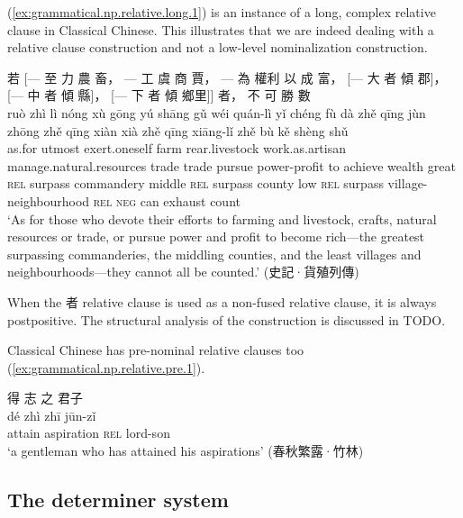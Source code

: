 \documentclass[UTF8, a4paper, oneside, scheme=plain, 12pt]{ctexrep}
\newcommand{\translate}[1]{`#1'}
\newcommand*{\category}[1]{\textsc{#1}}
\begin{document}
(\ref{ex:grammatical.np.relative.long.1}) is an instance of a long, complex relative clause in Classical Chinese.
This illustrates that we are indeed dealing with a relative clause construction 
and not a low-level nominalization construction.

\begin{exe}
    \ex\label{ex:grammatical.np.relative.long.1}
    \glll
    若 [--- 至 力 農 畜， --- 工 虞 商 賈， --- 為 權利 以 成 富， [--- 大 者 傾 郡]， [--- 中 者 傾 縣]， [--- 下 者 傾 鄉里]] 者， 不 可 勝 數 \\
    ruò {} zhì lì nóng xù {} gōng yú shāng gǔ {} wéi quán-lì yǐ chéng fù {} dà zhě qīng jùn {} zhōng zhě qīng xiàn {} xià zhě qīng xiāng-lǐ zhě bù kě shèng shǔ \\
    as.for {} utmost exert.oneself farm rear.livestock {} work.as.artisan manage.natural.resources trade trade {} pursue power-profit to achieve wealth {} great \category{rel} surpass commandery {} middle \category{rel} surpass county {} low \category{rel} surpass village-neighbourhood \category{rel} \category{neg} can exhaust count \\
    \glt\translate{As for those who devote their efforts to farming and livestock, crafts, natural resources or trade, or pursue power and profit to become rich---the greatest surpassing commanderies, the middling counties, and the least villages and neighbourhoods---they cannot all be counted.} \hfill (史記·貨殖列傳)
\end{exe}

When the 者 relative clause is used as a non-fused relative clause,
it is always postpositive.
The structural analysis of the construction is discussed in TODO.

Classical Chinese has pre-nominal relative clauses too (\ref{ex:grammatical.np.relative.pre.1}).

\begin{exe}
    \ex\label{ex:grammatical.np.relative.pre.1}
    \glll
    得 志 之 君子 \\
    dé zhì zhī jūn-zǐ \\
    attain aspiration \category{rel} lord-son \\
    \glt\translate{a gentleman who has attained his aspirations} \hfill (春秋繁露·竹林)
\end{exe}

\subsection{The determiner system}\label{sec:grammatical.np.determiner}
\end{document}
